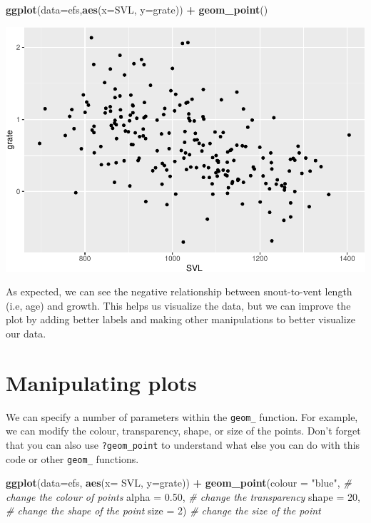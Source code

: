 \documentclass[
]{book}
\newenvironment{Shaded}{\begin{snugshade}}{\end{snugshade}}
\newcommand{\AttributeTok}[1]{\textcolor[rgb]{0.13,0.29,0.53}{#1}}
\newcommand{\CommentTok}[1]{\textcolor[rgb]{0.56,0.35,0.01}{\textit{#1}}}
\newcommand{\DecValTok}[1]{\textcolor[rgb]{0.00,0.00,0.81}{#1}}
\newcommand{\FloatTok}[1]{\textcolor[rgb]{0.00,0.00,0.81}{#1}}
\newcommand{\FunctionTok}[1]{\textcolor[rgb]{0.13,0.29,0.53}{\textbf{#1}}}
\newcommand{\NormalTok}[1]{#1}
\newcommand{\SpecialCharTok}[1]{\textcolor[rgb]{0.81,0.36,0.00}{\textbf{#1}}}
\newcommand{\StringTok}[1]{\textcolor[rgb]{0.31,0.60,0.02}{#1}}
\begin{document}
\begin{Shaded}
\begin{Highlighting}[]
\FunctionTok{ggplot}\NormalTok{(}\AttributeTok{data=}\NormalTok{efs,}\FunctionTok{aes}\NormalTok{(}\AttributeTok{x=}\NormalTok{SVL, }\AttributeTok{y=}\NormalTok{grate)) }\SpecialCharTok{+}
  \FunctionTok{geom\_point}\NormalTok{()}
\end{Highlighting}
\end{Shaded}

\includegraphics{series_files/figure-latex/unnamed-chunk-23-1.pdf}

As expected, we can see the negative relationship between snout-to-vent length (i.e, age) and growth. This helps us visualize the data, but we can improve the plot by adding better labels and making other manipulations to better visualize our data.

\hypertarget{manipulating-plots}{%
\section{Manipulating plots}\label{manipulating-plots}}

We can specify a number of parameters within the \texttt{geom\_} function. For example, we can modify the colour, transparency, shape, or size of the points. Don't forget that you can also use \texttt{?geom\_point} to understand what else you can do with this code or other \texttt{geom\_} functions.

\begin{Shaded}
\begin{Highlighting}[]
\FunctionTok{ggplot}\NormalTok{(}\AttributeTok{data=}\NormalTok{efs, }\FunctionTok{aes}\NormalTok{(}\AttributeTok{x=}\NormalTok{ SVL, }\AttributeTok{y=}\NormalTok{grate)) }\SpecialCharTok{+}   
    \FunctionTok{geom\_point}\NormalTok{(}\AttributeTok{colour =} \StringTok{"blue"}\NormalTok{,  }\CommentTok{\# change the colour of points}
               \AttributeTok{alpha =} \FloatTok{0.50}\NormalTok{,  }\CommentTok{\# change the transparency}
               \AttributeTok{shape =} \DecValTok{20}\NormalTok{,  }\CommentTok{\# change the shape of the point}
               \AttributeTok{size =} \DecValTok{2}\NormalTok{)  }\CommentTok{\# change the size of the point}
\end{Highlighting}
\end{Shaded}
\end{document}
